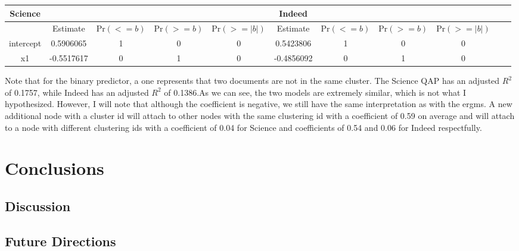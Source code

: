 \documentclass[12pt]{article}
\begin{document}
\begin{center}
	\begin{tabular}{ |c|c|c|c|c||c|c|c|c|c|c|  }
		\hline
		Science&&&&&Indeed&&& \\
		\hline
		&Estimate&Pr$(<=b)$ &Pr$(>=b)$ &Pr$(>=|b|)$&Estimate&Pr$(<=b)$ &Pr$(>=b)$ &Pr$(>=|b|)$ \\ 
		\hline 
		intercept&0.5906065& 1&       0&       0&0.5423806& 1&       0&       0&      \\
		x1&-0.5517617 &0       &1       &0&-0.4856092 &0       &1       &0\\
		\hline
	\end{tabular}
\end{center}
\vspace{2mm}
Note that for the binary predictor, a one represents that two documents are not in the same cluster. The Science QAP has an adjusted $R^2$ of 0.1757, while Indeed has an adjusted $R^2$ of 0.1386.As we can see, the two models are extremely similar, which is not what I hypothesized. However, I will note that although the coefficient is negative, we still have the same interpretation as with the ergms. A new additional node with a cluster id will attach to other nodes with the same clustering id with a coefficient of 0.59 on average and will attach to a node with different clustering ids with a coefficient of 0.04 for Science and coefficients of 0.54 and 0.06 for Indeed respectfully.    
\section{Conclusions}

\subsection{Discussion}

\subsection{Future Directions}






\newpage
\end{document}
